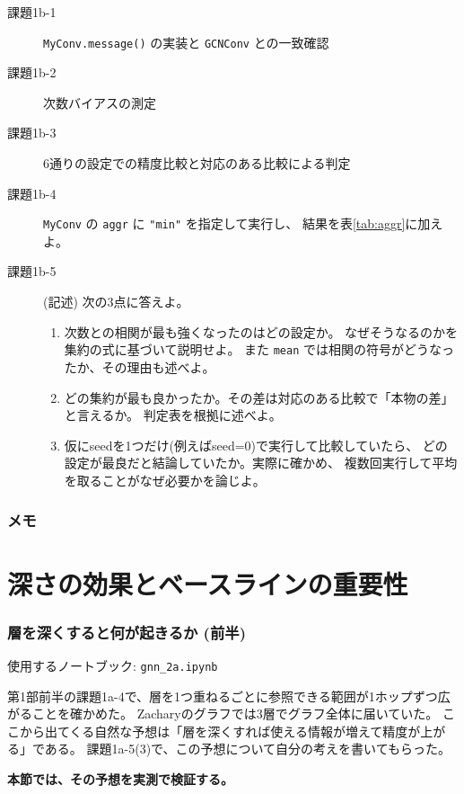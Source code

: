 \documentclass[11pt,a4paper]{jsarticle}
\begin{document}
\begin{description}
\item[課題1b-1] \verb|MyConv.message()| の実装と \verb|GCNConv| との一致確認
\item[課題1b-2] 次数バイアスの測定
\item[課題1b-3] 6通りの設定での精度比較と対応のある比較による判定
\item[課題1b-4] \verb|MyConv| の \verb|aggr| に \verb|"min"| を指定して実行し、
  結果を表\ref{tab:aggr}に加えよ。
\item[課題1b-5] (記述) 次の3点に答えよ。
  \begin{enumerate}
  \item 次数との相関が最も強くなったのはどの設定か。
    なぜそうなるのかを集約の式に基づいて説明せよ。
    また \verb|mean| では相関の符号がどうなったか、その理由も述べよ。
  \item どの集約が最も良かったか。その差は対応のある比較で「本物の差」と言えるか。
    判定表を根拠に述べよ。
  \item 仮にseedを1つだけ(例えばseed=0)で実行して比較していたら、
    どの設定が最良だと結論していたか。実際に確かめ、
    複数回実行して平均を取ることがなぜ必要かを論じよ。
  \end{enumerate}
\end{description}

\newpage
\section*{メモ}

\newpage
\part{深さの効果とベースラインの重要性}

\section{層を深くすると何が起きるか (前半)}

使用するノートブック: \verb|gnn_2a.ipynb|

第1部前半の課題1a-4で、層を1つ重ねるごとに参照できる範囲が1ホップずつ広がることを確かめた。
Zacharyのグラフでは3層でグラフ全体に届いていた。
ここから出てくる自然な予想は「層を深くすれば使える情報が増えて精度が上がる」である。
課題1a-5(3)で、この予想について自分の考えを書いてもらった。

\textbf{本節では、その予想を実測で検証する。}
\end{document}
